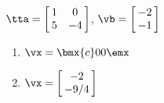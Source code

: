 {$\tta = \left[\hskip -3pt \begin{array}{cc} 1&0\\  5&-4\end {array} \hskip -3pt
\right]$, $\vb=\left[\hskip -3pt \begin{array}{c} -2\\  -1\end {array} \hskip -3pt
 \right]$}
{\begin{enumerate}
\item	 $\vx=\bmx{c}0\\0\emx$
\item	 $\vx=\left[\hskip -3pt \begin{array}{c} -2\\  -9/4\end {array} \hskip -3pt
\right]$
\end{enumerate}
 }







